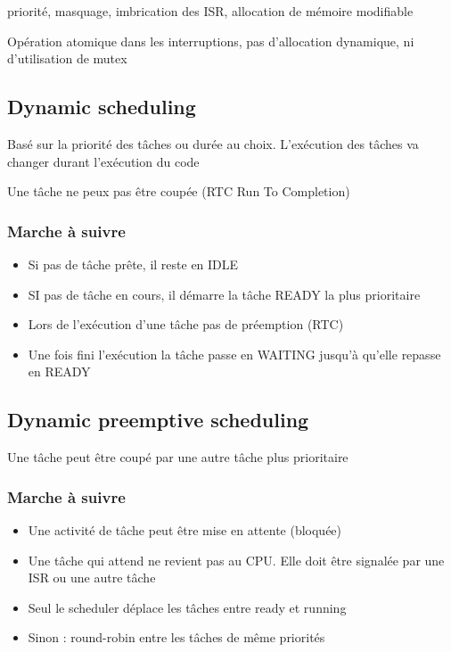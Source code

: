 \documentclass[resume]{subfiles}
\begin{document}
priorité, masquage, imbrication des ISR, allocation de mémoire modifiable 

Opération atomique dans les interruptions, pas d'allocation dynamique, ni d'utilisation de mutex

\subsection{Dynamic scheduling}

Basé sur la priorité des tâches ou durée au choix. L'exécution des tâches va changer durant l'exécution du code

Une tâche ne peux pas être coupée (RTC Run To Completion)

\subsubsection{Marche à suivre}
\begin{itemize}
\item Si pas de tâche prête, il reste en IDLE
\item SI pas de tâche en cours, il démarre la tâche READY la plus prioritaire
\item Lors de l'exécution d'une tâche pas de préemption (RTC)
\item Une fois fini l'exécution la tâche passe en WAITING jusqu'à qu'elle repasse en READY
\end{itemize}

\subsection{Dynamic preemptive scheduling}

Une tâche peut être coupé par une autre tâche plus prioritaire

\subsubsection{Marche à suivre}
\begin{itemize}
\item Une activité de tâche peut être mise en attente (bloquée)
\item Une tâche qui attend ne revient pas au CPU. Elle doit être signalée par une ISR ou une autre tâche
\item Seul le scheduler déplace les tâches entre ready et running
\item Sinon : round-robin entre les tâches de même priorités
\end{itemize}
\end{document}
